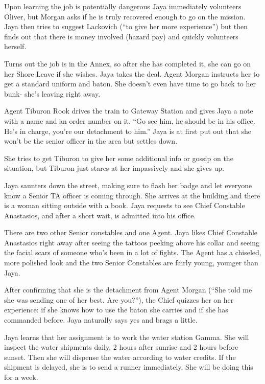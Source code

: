 Upon learning the job is potentially dangerous Jaya immediately volunteers Oliver, but Morgan asks if he is truly recovered enough to go on the mission.  Jaya then tries to suggest Lackovich (``to give her more experience'') but then finds out that there is money involved (hazard pay) and quickly volunteers herself.



Turns out the job is in the Annex, so after she has completed it, she can go on her Shore Leave if she wishes.  Jaya takes the deal.  Agent Morgan instructs her to get a standard uniform and baton.  She doesn't even have time to go back to her bunk- she's leaving right away.



Agent Tiburon Rook drives the train to Gateway Station and gives Jaya a note with a name and an order number on it. ``Go see him, he should be in his office.  He's in charge, you're our detachment to him.''  Jaya is at first put out that she won't be the senior officer in the area but settles down.



She tries to get Tiburon to give her some additional info or gossip on the situation, but Tiburon just stares at her impassively and she gives up.



Jaya saunters down the street, making sure to flash her badge and let everyone know a Senior TA officer is coming through.  She arrives at the building and there is a woman sitting outside with a book.  Jaya requests to see Chief Constable Anastasios, and after a short wait, is admitted into his office.  



There are two other Senior constables and one Agent.  Jaya likes Chief Constable Anastasios right away after seeing the tattoos peeking above his collar and seeing the facial scars of someone who's been in a lot of fights.  The Agent has a chiseled, more polished look and the two Senior Constables are fairly young, younger than Jaya.



After confirming that she is the detachment from Agent Morgan (``She told me she was sending one of her best.  Are you?''), the Chief quizzes her on her experience: if she knows how to use the baton she carries and if she has commanded before.  Jaya naturally says yes and brags a little.



Jaya learns that her assignment is to work the water station Gamma.  She will inspect the water shipments daily, 2 hours after sunrise and 2 hours before sunset.  Then she will dispense the water according to water credits.  If the shipment is delayed, she is to send a runner immediately.  She will be doing this for a week.




